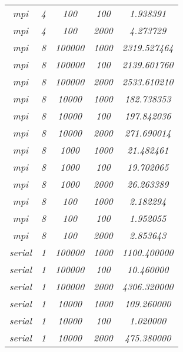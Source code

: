 \documentclass[../main.tex]{subfiles}
\begin{document}
\begin{table}[]
\begin{tabular}{|c|c|c|c|c|}
\textit{mpi}     & \textit{4}       & \textit{100}    & \textit{100}  & \textit{1.938391}    \\
\textit{mpi}     & \textit{4}       & \textit{100}    & \textit{2000} & \textit{4.273729}    \\
\textit{mpi}     & \textit{8}       & \textit{100000} & \textit{1000} & \textit{2319.527464} \\
\textit{mpi}     & \textit{8}       & \textit{100000} & \textit{100}  & \textit{2139.601760} \\
\textit{mpi}     & \textit{8}       & \textit{100000} & \textit{2000} & \textit{2533.610210} \\
\textit{mpi}     & \textit{8}       & \textit{10000}  & \textit{1000} & \textit{182.738353}  \\
\textit{mpi}     & \textit{8}       & \textit{10000}  & \textit{100}  & \textit{197.842036}  \\
\textit{mpi}     & \textit{8}       & \textit{10000}  & \textit{2000} & \textit{271.690014}  \\
\textit{mpi}     & \textit{8}       & \textit{1000}   & \textit{1000} & \textit{21.482461}   \\
\textit{mpi}     & \textit{8}       & \textit{1000}   & \textit{100}  & \textit{19.702065}   \\
\textit{mpi}     & \textit{8}       & \textit{1000}   & \textit{2000} & \textit{26.263389}   \\
\textit{mpi}     & \textit{8}       & \textit{100}    & \textit{1000} & \textit{2.182294}    \\
\textit{mpi}     & \textit{8}       & \textit{100}    & \textit{100}  & \textit{1.952055}    \\
\textit{mpi}     & \textit{8}       & \textit{100}    & \textit{2000} & \textit{2.853643}    \\
\textit{serial}  & \textit{1}       & \textit{100000} & \textit{1000} & \textit{1100.400000} \\
\textit{serial}  & \textit{1}       & \textit{100000} & \textit{100}  & \textit{10.460000}   \\
\textit{serial}  & \textit{1}       & \textit{100000} & \textit{2000} & \textit{4306.320000} \\
\textit{serial}  & \textit{1}       & \textit{10000}  & \textit{1000} & \textit{109.260000}  \\
\textit{serial}  & \textit{1}       & \textit{10000}  & \textit{100}  & \textit{1.020000}    \\
\textit{serial}  & \textit{1}       & \textit{10000}  & \textit{2000} & \textit{475.380000}  \\

\end{tabular}
\end{table}
\end{document}
